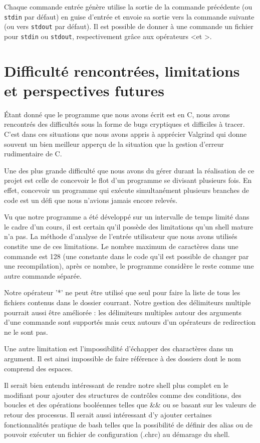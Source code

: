\documentclass{article}
\begin{document}
Chaque commande entrée génère utilise la sortie de la commande précédente (ou \texttt{stdin} par défaut) en guise d'entrée et envoie sa sortie vers la commande suivante (ou vers \texttt{stdout} par défaut). Il est possible de donner à une commande un fichier pour \texttt{stdin} ou \texttt{stdout}, respectivement grâce aux opérateurs \textless et \textgreater.

\section{Difficulté rencontrées, limitations et perspectives futures}
Étant donné que le programme que nous avons écrit est en C, nous avons rencontrés des difficultés sous la forme de bugs cryptiques et difficiles à tracer. C'est dans ces situations que nous avons appris à apprécier Valgrind qui donne souvent un bien meilleur apperçu de la situation que la gestion d'erreur rudimentaire de C. 

Une des plus grande difficulté que nous avons du gérer durant la réalisation de ce projet est celle de concevoir le flot d'un programme se divisant plusieurs fois. En effet, concevoir un programme qui exécute simultanément plusieurs branches de code est un défi que nous n'avions jamais encore relevés. 

Vu que notre programme a été développé sur un intervalle de temps limité dans le cadre d'un cours, il est certain qu'il possède des limitations qu'un shell mature n'a pas. La méthode d'analyse de l'entrée utilisateur que nous avons utilisés constite une de ces limitations. Le nombre maximum de caractères dans une commande est 128 (une constante dans le code qu'il est possible de changer par une recompilation), après ce nombre, le programme considère le reste comme une autre commande séparée.

Notre opérateur '*' ne peut être utilisé que seul pour faire la liste de tous les fichiers contenus dans le dossier courrant. Notre gestion des délimiteurs multiple pourrait aussi être améliorée : les délimiteurs multiples autour des arguments d'une commande sont supportés mais ceux autours d'un opérateurs de redirection ne le sont pas.

Une autre limitation est l'impossibilité d'échapper des charactères dans un argument. Il est ainsi impossible de faire référence à des dossiers dont le nom comprend des espaces.

Il serait bien entendu intéressant de rendre notre shell plus complet en le modifiant pour ajouter des structures de contrôles comme des conditions, des boucles et des opérations booléennes telles que \&\& ou \textbar\textbar se basant sur les valeurs de retour des processus. Il serait aussi intéressant d'y ajouter certaines fonctionnalités pratique de bash telles que la possibilité de définir des alias ou de pouvoir exécuter un fichier de configuration (.chrc) au démarage du shell.
\end{document}
